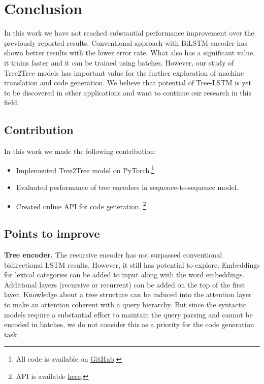 \chapter{Conclusion} 

\label{Chapter6} 

In this work we have not reached substantial performance improvement over the previously reported results. Conventional approach with BiLSTM encoder has shown better results with the lower error rate. What also has a significant value, it trains faster and it can be trained using batches. However, our study of Tree2Tree models has important value for the further exploration of machine translation and code generation. We believe that potential of Tree-LSTM is yet to be discovered in other applications and want to continue our research in this field.

\section{Contribution}
In this work we made the following contribution:
\begin{itemize}
    \item Implemented Tree2Tree model on PyTorch.\footnote{All code is available on \href{https://github.com/tsdaemon/treelstm-code-generation/}{GitHub}.}
    \item Evaluated performance of tree encoders in sequence-to-sequence model.
    \item Created online API for code generation. \footnote{API is available \href{http://daemon-engineer.com/apps/codegen}{here}.}
\end{itemize}

\section{Points to improve}
\textbf{Tree encoder.} The recursive encoder has not surpassed conventional bidirectional LSTM results. However, it still has potential to explore. Embeddings for lexical categories can be added to input along with the word embeddings. Additional layers (recursive or recurrent) can be added on the top of the first layer. Knowledge about a tree structure can be induced into the attention layer to make an attention coherent with a query hierarchy. But since the syntactic models require a substantial effort to maintain the query parsing and cannot be encoded in batches, we do not consider this as a priority for the code generation task.

